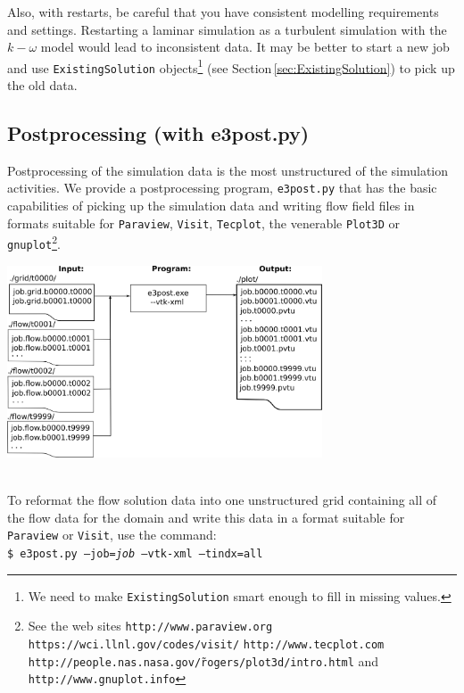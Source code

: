 \documentclass[12pt,a4paper,twoside]{article}
\begin{document}
\medskip
Also, with restarts, be careful that you have consistent modelling requirements and settings.
Restarting a laminar simulation as a turbulent simulation with the $k-\omega$ model would lead
to inconsistent data.
It may be better to start a new job and use \texttt{ExistingSolution} objects\footnote{We need to make \texttt{ExistingSolution} smart enough to fill in missing values.} (see Section\,\ref{sec:ExistingSolution}) to pick up the old data. 

\newpage
\subsection{Postprocessing (with e3post.py)} 
\label{sec:e3post}
%
Postprocessing of the simulation data is the most unstructured of the simulation activities.
We provide a postprocessing program, \texttt{e3post.py} that has the basic capabilities of picking up 
the simulation data and writing flow field files in formats suitable for 
\texttt{Paraview}, \texttt{Visit}, \texttt{Tecplot}, the venerable \texttt{Plot3D} or 
\texttt{gnuplot}\footnote{See the web sites  \texttt{http://www.paraview.org} \texttt{https://wci.llnl.gov/codes/visit/}
\texttt{http://www.tecplot.com} \texttt{http://people.nas.nasa.gov/\~rogers/plot3d/intro.html} and \texttt{http://www.gnuplot.info}}.
\vspace{0.25cm} \\
\centerline{\includegraphics[width=0.7\textwidth]{figs/post-process.png}}\\

\medskip
To reformat the flow solution data into one unstructured grid
containing all of the flow data for the domain and write this data in a format suitable
for \texttt{Paraview} or \texttt{Visit}, use the command:\\
\texttt{\$ e3post.py --job=\textit{job} --vtk-xml --tindx=all}\\ 
\end{document}

